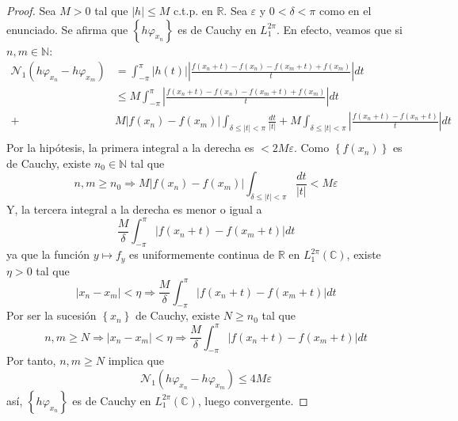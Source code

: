 \documentclass[12pt]{report}
\theoremstyle{largebreak}
\newcommand\abs[1]{\ensuremath{\left|#1\right|}}
\newcommand{\N}[2]{\ensuremath{\mathcal{N}_{#1}\left(#2\right)}}
\begin{document}
\begin{proof}
        Sea $M>0$ tal que $\abs{h}\leq M$ c.t.p. en $\mathbb{R}$. Sea $\varepsilon$ y $0<\delta<\pi$ como en el enunciado. Se afirma que $\left\{h\varphi_{x_n} \right\}$ es de Cauchy en $L_1^{2\pi}$. En efecto, veamos que si $n,m\in\mathbb{N}$:
        \begin{equation*}
            \begin{split}
                \N{1}{h\varphi_{x_n}-h\varphi_{x_m}}&=\int_{-\pi}^\pi\abs{h(t)}\abs{\frac{f(x_n+t)-f(x_n)-f(x_m+t)+f(x_m)}{t}}dt \\
                &\leq M\int_{-\pi }^{\pi}\abs{\frac{f(x_n+t)-f(x_n)-f(x_m+t)+f(x_m)}{t}}dt\\
                +&M\abs{f(x_n)-f(x_m)}\int_{ \delta\leq\abs{t}<\pi}\frac{dt}{\abs{t}}+M\int_{\delta\leq\abs{t}<\pi}\abs{\frac{f(x_n+t)-f(x_n+t)}{t}}dt\\
            \end{split}
        \end{equation*}
        Por la hipótesis, la primera integral a la derecha es $<2M\varepsilon$. Como $\left\{f(x_n) \right\}$ es de Cauchy, existe $n_0\in\mathbb{N}$ tal que
        \begin{equation*}
            n,m\geq n_0\Rightarrow M\abs{f(x_n)-f(x_m)}\int_{\delta\leq\abs{t}<\pi}\frac{dt}{\abs{t}}<M\varepsilon
        \end{equation*}
        Y, la tercera integral a la derecha es menor o igual a
        \begin{equation*}
            \frac{M}{\delta}\int_{-\pi}^{\pi}\abs{f(x_n+t)-f(x_m+t)}dt
        \end{equation*}
        ya que la función $y\mapsto f_y$ es uniformemente continua de $\mathbb{R}$ en $L_1^{2\pi}(\mathbb{C})$, existe $\eta>0$ tal que
        \begin{equation*}
            \abs{x_n-x_m}<\eta\Rightarrow\frac{M}{\delta}\int_{-\pi}^{\pi}\abs{f(x_n+t)-f(x_m+t)}dt
        \end{equation*}
        Por ser la sucesión $\left\{x_n \right\}$ de Cauchy, existe $N\geq n_0$ tal que
        \begin{equation*}
            n,m\geq N\Rightarrow\abs{x_n-x_m}<\eta\Rightarrow\frac{M}{\delta}\int_{-\pi}^{\pi}\abs{f(x_n+t)-f(x_m+t)}dt
        \end{equation*}
        Por tanto, $n,m\geq N$ implica que
        \begin{equation*}
            \N{1}{h\varphi_{x_n}-h\varphi_{x_m}}\leq 4M\varepsilon
        \end{equation*}
        así, $\left\{h\varphi_{ x_n} \right\}$ es de Cauchy en $L_1^{2\pi}(\mathbb{C})$, luego convergente.
    \end{proof}
\end{document}

